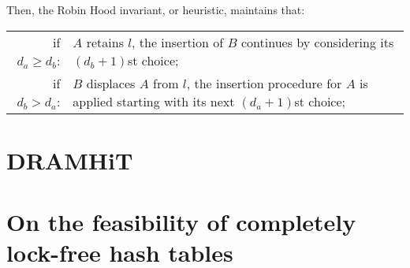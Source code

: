 Then, the Robin Hood invariant, or heuristic, maintains that:

\begin{tabular}{rp{8cm}}
	if $d_a \geq d_b$: & $A$ retains $l$, the insertion of $B$ continues by considering its $(d_b + 1)$st choice; \\
	if $d_b > d_a$: & $B$ displaces $A$ from $l$, the insertion procedure for $A$ is applied starting with its next $(d_a + 1)$st choice; \\
\end{tabular}


\section{DRAMHiT}\label{sec:dramhit}

\cite{dramhit}

\section{On the feasibility of completely lock-free hash tables}\label{sec:on-the-feasibility-of-completely-lock-free-hash-tables}

\cite{hesselink}
